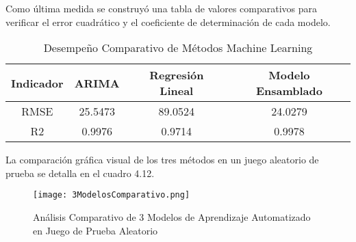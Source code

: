 Como última medida se construyó una tabla de valores comparativos para verificar el error cuadrático y el coeficiente de determinación de cada modelo. 

\begin{table}[h!]
  \begin{center}
    \caption{Desempeño Comparativo de Métodos Machine Learning}
    \label{tab:comparativoMLmetodos}
    \begin{tabular}{c|c|c|c} 
      \textbf{Indicador} & \textbf{ARIMA} & \textbf{Regresión Lineal} & \textbf{Modelo Ensamblado}\\
      \hline
      RMSE & 25.5473 &89.0524 & 24.0279 \\
      R2 & 0.9976 & 0.9714 & 0.9978 \\
    \end{tabular}
  \end{center}
\end{table}
  
La comparación gráfica visual de los tres métodos en un juego aleatorio de prueba se detalla en el cuadro 4.12.

\begin{figure}[H]
    \centering
    \texttt{[image: 3ModelosComparativo.png]}
    \caption{Análisis Comparativo de 3 Modelos de Aprendizaje Automatizado en Juego de Prueba Aleatorio}
\end{figure}   
